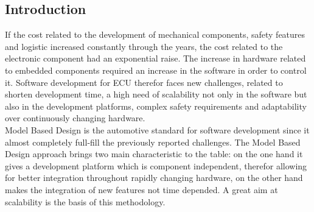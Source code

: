 \documentclass[../main.tex]{subfiles}
\begin{document}
\subsection{Introduction}
If the cost related to the development of mechanical components, safety features and logistic increased constantly through the years, the cost related to the electronic component had an exponential raise. The increase in hardware related to embedded components required an increase in the software in order to control it.
Software development for \gls{ECU} therefor faces new challenges, related to shorten development time, a high need of scalability  not only in the software but also in the development platforms, complex safety requirements and adaptability over continuously changing hardware.\\
Model Based Design is the automotive standard for software development since it almost completely full-fill the previously reported challenges. The Model Based Design approach brings two main characteristic to the table: on the one hand it gives a development platform which is component independent, therefor allowing for better integration throughout rapidly changing hardware, on the other hand makes the integration of new features not time depended. A great aim at scalability is the basis of this methodology. 
\end{document}
